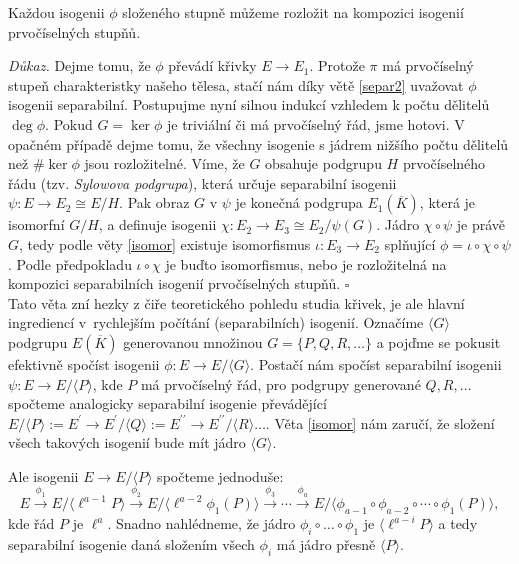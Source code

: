 \documentclass[12pt]{report}
\begin{document}
\begin{veta}\label{prvoo}
Každou isogenii $\phi$ složeného stupně můžeme rozložit na kompozici isogenií prvočíselných stupňů.
\end{veta}
\noindent \textit{Důkaz.} Dejme tomu, že  $\phi$ převádí křivky $E \longrightarrow E_1$. Protože $\pi$ má prvočíselný stupeň charakteristky našeho tělesa, stačí nám díky větě \ref{separ2} uvažovat $\phi$ isogenii separabilní. Postupujme nyní silnou indukcí vzhledem k počtu dělitelů $\deg \phi$. Pokud $G = \ker \phi$ je triviální či má prvočíselný řád, jsme hotovi. V opačném případě dejme tomu, že všechny isogenie s jádrem nižšího počtu dělitelů než $\# \ker \phi$ jsou rozložitelné. Víme, že $G$ obsahuje podgrupu $H$ prvočíselného řádu (tzv. \textit{Sylowova podgrupa}), která určuje separabilní isogenii $\psi : E \longrightarrow E_2 \cong E/H$. Pak obraz $G$ v $\psi$ je konečná podgrupa $E_1 (\overline{K})$, která je isomorfní $G/H$, a definuje isogenii $\chi : E_2 \longrightarrow E_3 \cong E_2/\psi(G)$. Jádro $\chi \circ \psi$ je právě $G$, tedy podle věty \ref{isomor} existuje isomorfismus $\iota : E_3 \longrightarrow E_2$ splňující $\phi = \iota \circ \chi \circ \psi$. Podle předpokladu $\iota \circ \chi$ je buďto isomorfismus, nebo je rozložitelná na kompozici separabilních isogenií prvočíselných stupňů. \hfill $\square$\\

Tato věta zní hezky z čiře teoretického pohledu studia křivek, je ale hlavní ingrediencí v~rychlejším počítání (separabilních) isogenií. Označíme $\langle G \rangle$ podgrupu $E(\overline{K})$ generovanou množinou $G = \lbrace P,Q,R,\dots \rbrace$ a pojďme se pokusit efektivně spočíst isogenii $\phi : E \longrightarrow E/ \langle G \rangle$. Postačí nám spočíst separabilní isogenii $\psi : E \longrightarrow E/\langle P \rangle$, kde $P$ má prvočíselný řád, pro podgrupy generované $Q,R, \dots$ spočteme analogicky separabilní isogenie převádějící $E/\langle P \rangle := E^\prime \longrightarrow E^\prime/\langle Q \rangle := E^{\prime \prime} \longrightarrow E^{\prime \prime}/\langle R \rangle \dots$. Věta \ref{isomor} nám zaručí, že složení všech takových isogenií bude mít jádro $\langle G \rangle$.

Ale isogenii $E \longrightarrow E/\langle P \rangle$ spočteme jednoduše:
\begin{equation*}
E \stackrel{\phi_1}{\longrightarrow} E/\langle \ell^{a-1} P \rangle \stackrel{\phi_2}{\longrightarrow}  E/\langle \ell^{a-2} \phi_1 (P) \rangle \stackrel{\phi_3}{\longrightarrow} \cdots \stackrel{\phi_{a}}{\longrightarrow} E/\langle \phi_{a-1} \circ \phi_{a-2} \circ \cdots \circ \phi_1 (P) \rangle,
\end{equation*}
kde řád $P$ je $\ell^a$. Snadno nahlédneme, že jádro $\phi_i \circ \dots \circ \phi_1$ je $\langle \ell^{a-i} P \rangle$ a tedy separabilní isogenie daná složením všech $\phi_i$ má jádro přesně $\langle P \rangle$.
\end{document}
